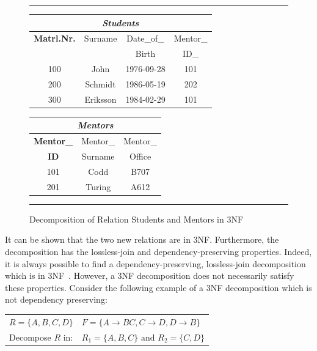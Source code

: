 \begin{figure}[h]
\hrule
\vspace{0.25cm}
\begin{minipage}[t]{0.5\linewidth}\centering
\begin{tabular}{|c|c|c|c|}
\hline
\multicolumn{4}{|c|}{\textit{Students}} \\
\hline
\textbf{Matrl.Nr.} & Surname & Date\_of\_  & Mentor\_ \\
                   &         & Birth    & ID\_     \\
\hline \hline
100 & John     & 1976-09-28 & 101 \\
200 & Schmidt  & 1986-05-19 & 202 \\
300 & Eriksson & 1984-02-29 & 101 \\
\hline
\end{tabular}
\end{minipage}
\hspace{0.5cm}
\begin{minipage}[t]{0.5\linewidth}\centering
\begin{tabular}{|c|c|c|}
\hline
\multicolumn{3}{|c|}{\textit{Mentors}} \\ \hline
 \textbf{Mentor\_} & Mentor\_  & Mentor\_ \\
 \textbf{ID}       & Surname   & Office \\
 \hline \hline
 101 & Codd   & B707 \\
 201 & Turing & A612 \\ \hline
\end{tabular}
\end{minipage}

\caption{Decomposition of Relation Students and Mentors in 3NF}\label{alg:relsc3nf}
\hrule
\end{figure}

It can be shown that the two new relations are in 3NF. Furthermore, the 
decomposition has the lossless-join and dependency-preserving properties. Indeed, it is always 
possible to find a dependency-preserving, lossless-join decomposition which is in 3NF~\cite[Section 6.8]{bdb2}.
However, a 3NF decomposition does not necessarily satisfy these properties. Consider the following example
of a 3NF decomposition which is not dependency preserving:

\begin{center}
\begin{tabular}[h]{l l}
  $R = \{A, B, C, D\}$ & $F = \{A \rightarrow BC, C \rightarrow D, D \rightarrow B\}$ \\
  Decompose $R$ in:  & $R_1 = \{A, B, C\} \mbox{ and } R_2 = \{C,D\}$ \\ 
\end{tabular}
\end{center}

